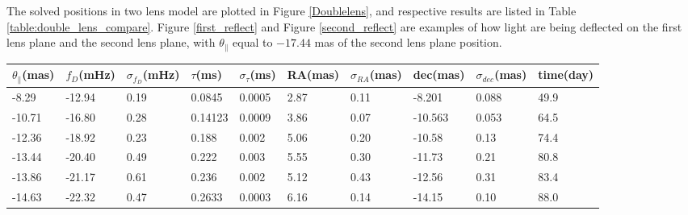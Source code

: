 \documentclass[useAMS,usenatbib]{mn2e}
\begin{document}
The solved positions in two lens model are plotted in Figure \ref{Doublelens}, and respective results are listed in Table \ref{table:double_lens_compare}.  Figure \ref{first_reflect} and Figure \ref{second_reflect} are examples of how light are being deflected on the first lens plane and the second lens plane, with $\theta_{\parallel}$ equal to $-17.44$ mas of the second lens plane position.




\begin{table}
\centering
\begin{tabular}{llllllllll}
\hline
$\theta_{\parallel}$(mas) &$f_D$(mHz) & $\sigma_{f_D}$(mHz) & $\tau$(ms) & $\sigma_{\tau}$(ms) & RA(mas) & $\sigma_{RA}$(mas) & dec(mas) & $\sigma_{dec}$(mas) & time(day)\\
\hline
 -8.29   & -12.94                            & 0.19      & 0.0845  & 0.0005          & 2.87    & 0.11                                     & -8.201     & 0.088      & 49.9                                \\

-10.71   &-16.80                             & 0.28      & 0.14123 & 0.0009         & 3.86    & 0.07                                     & -10.563    & 0.053      &64.5                                \\

-12.36   &-18.92                            & 0.23      & 0.188   & 0.002           & 5.06    & 0.20                                      & -10.58    & 0.13      &74.4                        \\

-13.44 & -20.40                             & 0.49      & 0.222   & 0.003           & 5.55    & 0.30                                      & -11.73    & 0.21      &80.8                                \\

-13.86 &-21.17                            & 0.61      & 0.236   & 0.002           & 5.12    & 0.43                                     & -12.56    & 0.31      &83.4                                \\

-14.63   &-22.32                            & 0.47      & 0.2633  & 0.0003          & 6.16    & 0.14                                     & -14.15    & 0.10       &88.0                                \\


\end{tabular}
\end{table}
\end{document}
